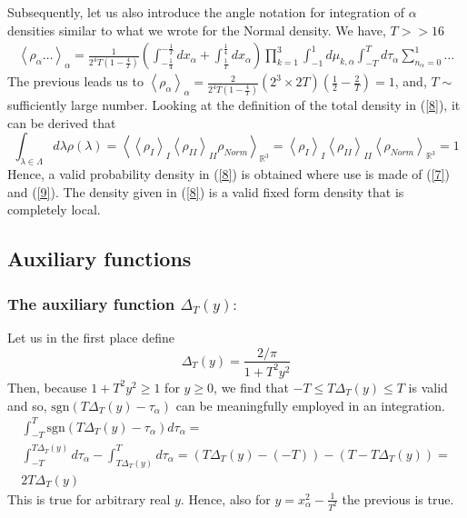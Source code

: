 \documentclass{appolb}
\newcommand{\sgn}{\text{sgn}}
\begin{document}
Subsequently, let us also introduce the angle notation for integration of $\alpha$ densities similar to what we wrote for the Normal density. We have, $T>>16$
\begin{eqnarray}\label{10}
\left \langle  \rho_{\alpha} \dots \right\rangle_{\alpha} =\frac{1}{2^4 T\left(1-\frac{4}{T}\right)}\left( \int_{-\frac{1}{4}}^{-\frac{1}{T}} d x_{\alpha} + \int_{\frac{1}{T}}^{\frac{1}{4}} d x_{\alpha}\right)\prod_{k=1}^3 \int_{-1}^1 d\mu_{k,\alpha} \int_{-T}^{T} d\tau_{\alpha} \sum_{n_{\alpha}=0}^1 \dots
\end{eqnarray}
The previous leads us to $\left\langle \rho_{\alpha}  \right\rangle_{\alpha}=\frac{2}{2^4 T\left(1-\frac{4}{T}\right)}\left( 2^3 \times 2T\right)\left(\frac{1}{2}-\frac{2}{T}\right)=1 $, and, $T \sim $ sufficiently large number. 
Looking at the definition of the total density in (\ref{8}), it can be derived that 
\begin{equation}\label{11}
\int_{\lambda\in \Lambda} d\lambda \rho(\lambda)=\left \langle \left \langle \rho_{I} \right\rangle_{I}\left \langle \rho_{II} \right\rangle_{II}\rho_{Norm}\right\rangle_{\mathbb{R}^3}=\left \langle \rho_{I} \right\rangle_{I}\left \langle \rho_{II} \right\rangle_{II}\left\langle\rho_{Norm}\right\rangle_{\mathbb{R}^3} =1
\end{equation}
Hence, a valid probability density in (\ref{8}) is obtained where use is made of (\ref{7}) and (\ref{9}).
The density given in (\ref{8}) is a valid fixed form density that is completely local.

\subsection{Auxiliary functions}
\subsubsection{ The auxiliary function $\Delta_T(y):$}
Let us in the first place define
\begin{equation}\label{12}
\Delta_T(y)=\frac{2/\pi}{1+T^2y^2}
\end{equation}
Then, because $1+T^2y^2 \geq 1$ for $y\geq 0$, we find that $-T \leq T\Delta_T(y) \leq T$ is valid and so, $\sgn\left( T\Delta_T(y) -\tau_{\alpha}\right)$ can be meaningfully  employed in an integration. 
\begin{eqnarray}\label{13}
\int_{-T}^{T} \sgn\left( T\Delta_T(y) -\tau_{\alpha}\right) d \tau_{\alpha} =
\nonumber\\
\int_{-T}^{T\Delta_T(y)}d\tau_{\alpha}-\int_{T\Delta_T(y)}^{T} d\tau_{\alpha}=
\left(T\Delta_T(y)-(-T)\right)-\left(T-T\Delta_T(y) \right)  =
\nonumber\\ 
2T\Delta_T(y)
\end{eqnarray}
This is true for arbitrary real $y$. Hence, also for $y=x_{\alpha}^2- \frac{1}{T^2}$ the previous is true.
\end{document}
